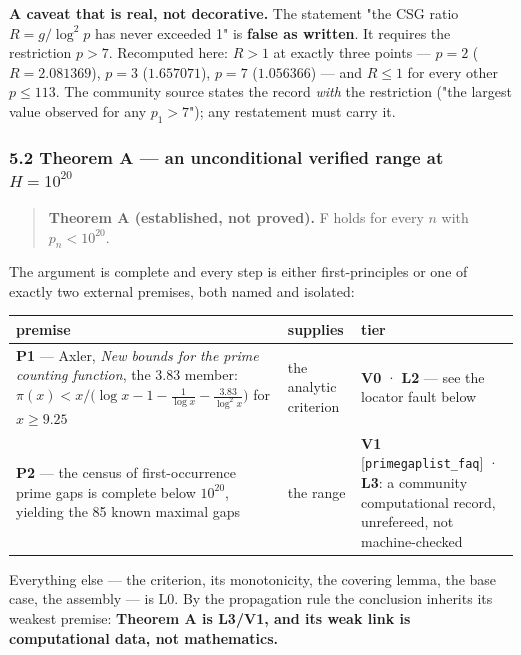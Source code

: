 \documentclass[
  a4paper,
  11pt]{article}
\begin{document}
\textbf{A caveat that is real, not decorative.} The statement "the CSG
ratio \(R = g/\log^2 p\) has never exceeded 1" is \textbf{false as
written}. It requires the restriction \(p > 7\). Recomputed here:
\(R > 1\) at exactly three points --- \(p=2\) (\(R = 2.081369\)),
\(p=3\) (\(1.657071\)), \(p=7\) (\(1.056366\)) --- and \(R \le 1\) for
every other \(p \le 113\). The community source states the record
\emph{with} the restriction ("the largest value observed for any
\(p_1 > 7\)"); any restatement must carry it.

\subsubsection{\texorpdfstring{5.2 Theorem A --- an unconditional
verified range at
\(H = 10^{20}\)}{5.2 Theorem A --- an unconditional verified range at H = 10\^{}\{20\}}}\label{52-theorem-a--an-unconditional-verified-range-at-h--1020}

\begin{quote}
\textbf{Theorem A (established, not proved).} F holds for every \(n\)
with \(p_n < 10^{20}\).
\end{quote}

The argument is complete and every step is either first-principles or
one of exactly two external premises, both named and isolated:

\begin{longtable}[]{@{}lll@{}}
\toprule\noalign{}
premise & supplies & tier \\
\midrule\noalign{}
\endhead
\bottomrule\noalign{}
\endlastfoot
\textbf{P1} --- Axler, \emph{New bounds for the prime counting
function}, the \(3.83\) member:
\(\pi(x) < x\big/\big(\log x - 1 - \tfrac1{\log x} - \tfrac{3.83}{\log^2 x}\big)\)
for \(x \ge 9.25\) & the analytic criterion & \textbf{V0} · \textbf{L2}
--- see the locator fault below \\
\textbf{P2} --- the census of first-occurrence prime gaps is complete
below \(10^{20}\), yielding the 85 known maximal gaps & the range &
\textbf{V1} {[}\texttt{primegaplist\_faq}{]} · \textbf{L3}: a community
computational record, unrefereed, not machine-checked \\
\end{longtable}

Everything else --- the criterion, its monotonicity, the covering lemma,
the base case, the assembly --- is L0. By the propagation rule the
conclusion inherits its weakest premise: \textbf{Theorem A is L3/V1, and
its weak link is computational data, not mathematics.}
\end{document}
